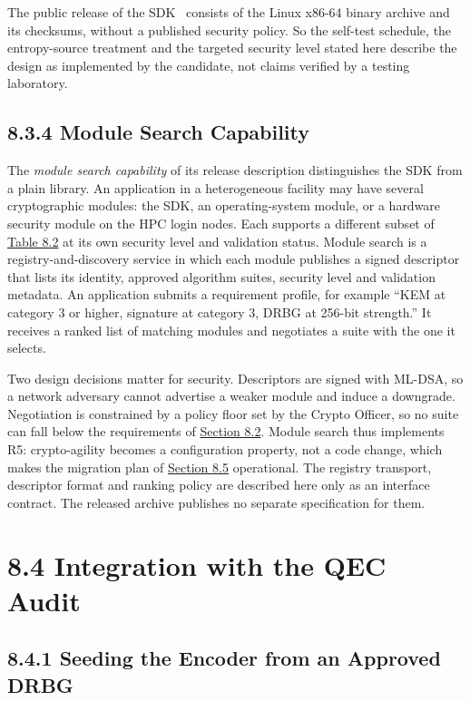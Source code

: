 \documentclass{report}
\theoremstyle{plain}
\theoremstyle{definition}
\theoremstyle{remark}
\begin{document}
The public release of the SDK~\cite{guo2026lightriderqpc} consists of the Linux x86-64 binary archive and its checksums, without a published security policy. So the self-test schedule, the entropy-source treatment and the targeted security level stated here describe the design as implemented by the candidate, not claims verified by a testing laboratory.

\subsection{8.3.4 Module Search Capability}\label{sec:pqc:search}

The \emph{module search capability} of its release description distinguishes the SDK from a plain library. An application in a heterogeneous facility may have several cryptographic modules: the SDK, an operating-system module, or a hardware security module on the HPC login nodes. Each supports a different subset of \hyperref[tab:pqc:algorithms]{Table 8.2} at its own security level and validation status. Module search is a registry-and-discovery service in which each module publishes a signed descriptor that lists its identity, approved algorithm suites, security level and validation metadata. An application submits a requirement profile, for example ``KEM at category 3 or higher, signature at category 3, DRBG at 256-bit strength.'' It receives a ranked list of matching modules and negotiates a suite with the one it selects.

Two design decisions matter for security. Descriptors are signed with ML-DSA, so a network adversary cannot advertise a weaker module and induce a downgrade. Negotiation is constrained by a policy floor set by the Crypto Officer, so no suite can fall below the requirements of \hyperref[sec:pqc:requirements]{Section 8.2}. Module search thus implements R5: crypto-agility becomes a configuration property, not a code change, which makes the migration plan of \hyperref[sec:pqc:timeline]{Section 8.5} operational. The registry transport, descriptor format and ranking policy are described here only as an interface contract. The released archive publishes no separate specification for them.

\section{8.4 Integration with the QEC Audit}\label{sec:pqc:integration}

\subsection{8.4.1 Seeding the Encoder from an Approved DRBG}\label{sec:pqc:seed}
\end{document}

